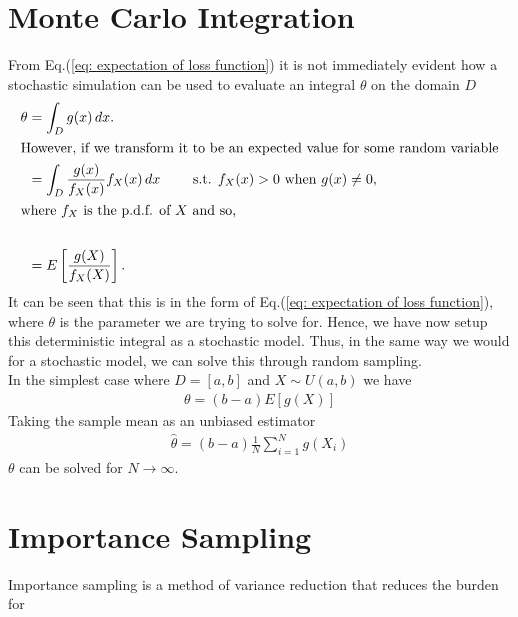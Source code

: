\documentclass{article}
\begin{document}
\section{Monte Carlo Integration}
From Eq.(\ref{eq: expectation of loss function}) it is not immediately evident 
how a stochastic simulation can be used to evaluate an integral $\theta$ on the domain $D$
\begin{align}
    \theta &= \int_{D} g(x) \, dx. \notag \\
    \intertext{However, if we transform it to be an expected value for some random variable} \notag 
    &= \int_{D} \frac{g(x)}{f_X(x)}f_X(x) \, dx \quad\quad \text{    s.t.    } f_X(x) >0 \text{    when    } g(x)\neq0, \notag\\ 
    \intertext{where $f_X$ is the p.d.f. of $X$ and so,} \notag \\
    &=E \left[ \frac{g(X)}{f_X(X)} \right].
\end{align}
It can be seen that this is in the form of Eq.(\ref{eq: expectation of loss function}),
where $\theta$ is the parameter we are trying to solve for. 
Hence, we have now setup this deterministic integral as a stochastic model.
Thus, in the same way we would for a stochastic model, we can solve this through random sampling. \\
In the simplest case where $D = [a,b]$ and $X\sim U(a,b)$ we have 
\begin{align}
    \theta = (b-a)E[g(X)] 
\end{align}
Taking the sample mean as an unbiased estimator
\begin{align}
    \hat{\theta} = (b-a) \frac{1}{N} \sum_{i=1}^{N}g(X_i)
\end{align}
$\theta$ can be solved for $N \rightarrow \infty$.

\section{Importance Sampling}
Importance sampling is a method of variance reduction that reduces the burden for 












 
\end{document}
